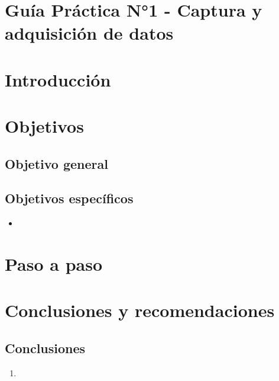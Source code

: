 \documentclass[12pt]{article}
\begin{document}
        

        \tableofcontents
        \newpage

        \section*{\centering Guía Práctica N°1 - Captura y adquisición de datos}

        \section{Introducción}
    
        
        \section{Objetivos}
                \subsection{Objetivo general}
                
                \subsection{Objetivos específicos}
                        \begin{itemize}
                        \item 
                        \end{itemize}


        \section{Paso a paso}
                \subsection{}


        \section{Conclusiones y recomendaciones}
                \subsection{Conclusiones}
                        \begin{enumerate}
                        \item 
                        \end{enumerate}
\end{document}
